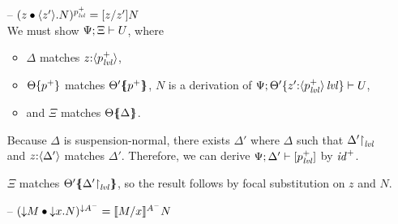 \begin{itemize}
\item[--] $(\subst{z}{\tetap{z'}{N}})^{p^+_{\mlvl}} = [z/z']N$\smallskip\\
  We must show $\foc{\Psi}{\Xi}{U}$, where 
  \begin{itemize}
   \item $\Delta$ matches $z{:}\susp{p^+_\mlvl}$,
   \item $\tackon{\Theta}{p^+}$ matches $\frameoff{\Theta'}{p^+}$,
      $N$ is a derivation of 
      $\foc{\Psi}{\tackon{\Theta'}{z'{:}\islvl{\susp{p^+_\mlvl}}}}{U}$,
   \item and $\Xi$ matches $\frameoff{\Theta}{\Delta}$.
  \end{itemize}
  Because $\Delta$ is suspension-normal, there exists $\Delta'$ where
  $\Delta$ such that $\restrictto{\Delta'}{\mlvl}$ and
  $z{:}\susp{\Delta'}$ matches $\Delta'$. %
  Therefore, we can derive $\foc{\Psi}{\Delta'}{[p^+_\mlvl]}$ by ${\it
    id}^+$.

  $\Xi$ matches
  $\frameoff{\Theta'}{\restrictto{\Delta'}{\mlvl}}$,
  so the result follows by focal substitution on $z$ and $N$. 

\smallskip
 
\item[--] $(\subst{\tdownr{M}}{\tdownl{x}{N}})^{{\downarrow}A^-} 
           = \rsubsta{M}{x}{N}{A^-}$ %


\end{itemize}
